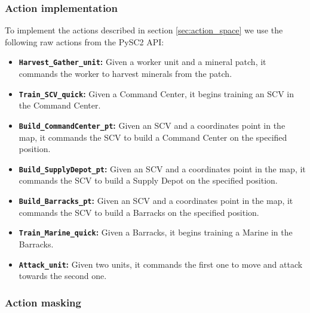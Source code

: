 \subsubsection*{Action implementation}

To implement the actions described in section \ref{sec:action_space} we use the following raw actions from the PySC2 API:

\begin{itemize}
    \item \textbf{\texttt{Harvest\_Gather\_unit}:} Given a worker unit and a mineral patch, it commands the worker to harvest minerals from the patch.
    \item \textbf{\texttt{Train\_SCV\_quick}:} Given a Command Center, it begins training an SCV in the Command Center.
    \item \textbf{\texttt{Build\_CommandCenter\_pt}:} Given an SCV and a coordinates point in the map, it commands the SCV to build a Command Center on the specified position.
    \item \textbf{\texttt{Build\_SupplyDepot\_pt}:} Given an SCV and a coordinates point in the map, it commands the SCV to build a Supply Depot on the specified position.
    \item \textbf{\texttt{Build\_Barracks\_pt}:} Given an SCV and a coordinates point in the map, it commands the SCV to build a Barracks on the specified position.
    \item \textbf{\texttt{Train\_Marine\_quick}:} Given a Barracks, it begins training a Marine in the Barracks.
    \item \textbf{\texttt{Attack\_unit}:} Given two units, it commands the first one to move and attack towards the second one.
\end{itemize}

\subsubsection*{Action masking}

